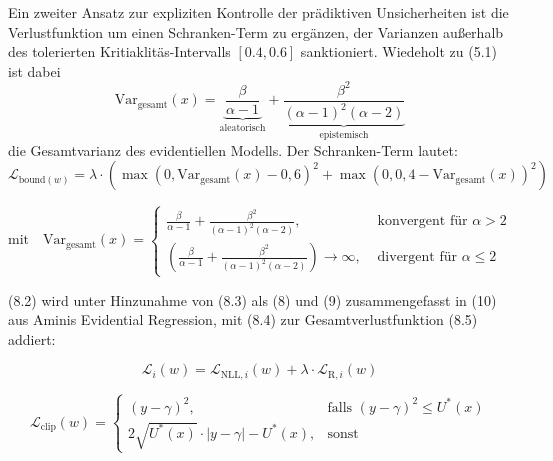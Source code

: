\begin{otherlanguage}{ngerman}
Ein zweiter Ansatz zur expliziten Kontrolle der prädiktiven Unsicherheiten ist die Verlustfunktion um einen Schranken-Term zu ergänzen, der Varianzen außerhalb des tolerierten Kritiaklitäs-Intervalls \([0{.}4, 0{.}6]\) sanktioniert. Wiedeholt zu (5.1) ist dabei \[
\text{Var}_{\text{gesamt}}(x) = \underbrace{\frac{\beta}{\alpha - 1}}_{\text{aleatorisch}} + \underbrace{\frac{\beta^2}{(\alpha - 1)^2(\alpha - 2)}}_{\text{epistemisch}}
\]
die Gesamtvarianz des evidentiellen Modells. Der Schranken-Term lautet:
\begin{equation}
\mathcal{L}_{\text{bound}(w)} = \lambda \cdot \left( 
  \max(0, \text{Var}_{\text{gesamt}}(x) - 0{,}6)^2 
  + \max(0, 0{,}4 - \text{Var}_{\text{gesamt}}(x))^2 
\right)
\label{eq:loss_varbound}
\end{equation}

\vspace{0.125\baselineskip}

\noindent
\begin{minipage}{\linewidth}
\[
\text{mit} \quad
\text{Var}_{\text{gesamt}}(x) =
\begin{cases}
\frac{\beta}{\alpha - 1} + \frac{\beta^2}{(\alpha - 1)^2 (\alpha - 2)},                                         & \text{ konvergent für } \alpha > 2 \\
\left( \frac{\beta}{\alpha - 1} + \frac{\beta^2}{(\alpha - 1)^2 (\alpha - 2)} \right) \longrightarrow \infty,   & \text{ divergent für } \alpha \leq 2
\end{cases}
\]
\vspace{0.125\baselineskip}
\noindent

\end{minipage}

(8.2) wird unter Hinzunahme von (8.3) als (8) und (9) zusammengefasst in (10) aus Aminis Evidential Regression, mit (8.4) zur Gesamtverlustfunktion (8.5) addiert: 

\begin{equation}
\mathcal{L}_i(w) = \mathcal{L}_{\text{NLL},i}(w) + \lambda \cdot \mathcal{L}_{\text{R},i}(w)
\label{eq:evidential_loss}
\end{equation}

\begin{equation}
\mathcal{L}_{\text{clip}}(w) =
\begin{cases}
(y - \gamma)^2, & \text{falls } (y - \gamma)^2 \leq U^*(x) \\
2 \sqrt{U^*(x)} \cdot |y - \gamma| - U^*(x), & \text{sonst}
\end{cases}
\end{equation}


\end{otherlanguage}

